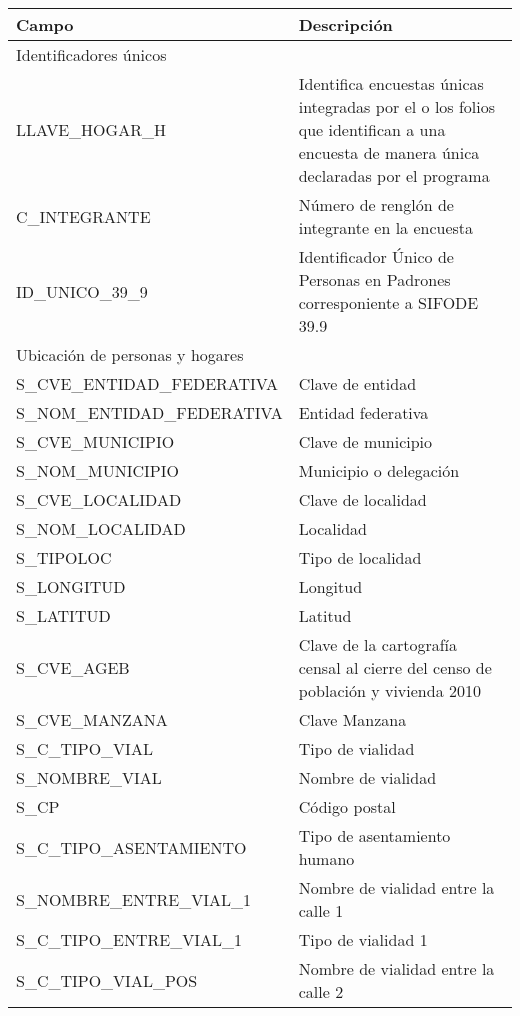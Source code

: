 \begin{longtable}{|p{8cm}|p{8cm}|}
    \hline
    \hline
    Campo  & Descripción\\
    \hline
    \multicolumn{2}{l}{Identificadores únicos}\\
    \hline
    LLAVE\_HOGAR\_H & Identifica encuestas únicas integradas por el o los folios que identifican a una encuesta de manera única declaradas por el programa\\
    \hline
    C\_INTEGRANTE & Número de renglón de integrante en la encuesta\\
    \hline
    ID\_UNICO\_39\_9 & Identificador Único de Personas en Padrones corresponiente a SIFODE 39.9\\
    \hline
    \hline
    \multicolumn{2}{l}{Ubicación de personas y hogares}\\
    \hline
    S\_CVE\_ENTIDAD\_FEDERATIVA & Clave de entidad \\
    \hline
    S\_NOM\_ENTIDAD\_FEDERATIVA & Entidad federativa \\
    \hline
    S\_CVE\_MUNICIPIO & Clave de municipio\\
    \hline
    S\_NOM\_MUNICIPIO & Municipio o delegación\\
    \hline
    S\_CVE\_LOCALIDAD & Clave de localidad\\
    \hline
    S\_NOM\_LOCALIDAD & Localidad \\
    \hline
    S\_TIPOLOC & Tipo de localidad \\
    \hline
    S\_LONGITUD & Longitud \\
    \hline
    S\_LATITUD & Latitud \\
    \hline
    S\_CVE\_AGEB & Clave de la cartografía censal al cierre del censo de población y vivienda 2010 \\
    \hline
    S\_CVE\_MANZANA & Clave Manzana \\
    \hline
    S\_C\_TIPO\_VIAL & Tipo de vialidad \\
    \hline
    S\_NOMBRE\_VIAL & Nombre de vialidad \\
    \hline
    S\_CP & Código postal \\
    \hline
    S\_C\_TIPO\_ASENTAMIENTO & Tipo de asentamiento humano \\
    \hline
    S\_NOMBRE\_ENTRE\_VIAL\_1 & Nombre de vialidad entre la calle 1 \\
    \hline
    S\_C\_TIPO\_ENTRE\_VIAL\_1 & Tipo de vialidad 1 \\
    \hline
    S\_C\_TIPO\_VIAL\_POS & Nombre de vialidad entre la calle 2 \\

\end{longtable}
